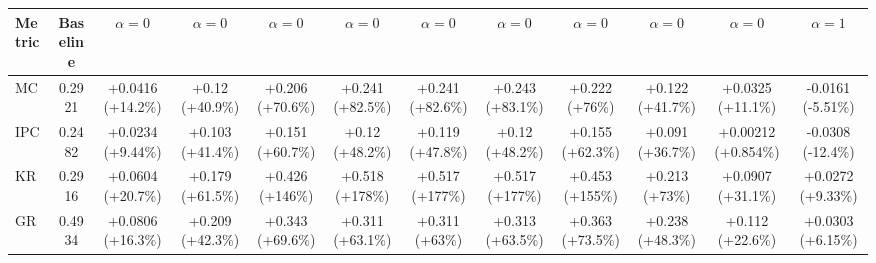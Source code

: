 \begin{tabular}{lccccccccccc}
\toprule
Metric & Baseline & $\alpha=0$ & $\alpha=0$ & $\alpha=0$ & $\alpha=0$ & $\alpha=0$ & $\alpha=0$ & $\alpha=0$ & $\alpha=0$ & $\alpha=0$ & $\alpha=1$ \\
\midrule
MC & 0.2921 & +0.0416 (+14.2\%) & +0.12 (+40.9\%) & +0.206 (+70.6\%) & +0.241 (+82.5\%) & +0.241 (+82.6\%) & +0.243 (+83.1\%) & +0.222 (+76\%) & +0.122 (+41.7\%) & +0.0325 (+11.1\%) & -0.0161 (-5.51\%) \\
IPC & 0.2482 & +0.0234 (+9.44\%) & +0.103 (+41.4\%) & +0.151 (+60.7\%) & +0.12 (+48.2\%) & +0.119 (+47.8\%) & +0.12 (+48.2\%) & +0.155 (+62.3\%) & +0.091 (+36.7\%) & +0.00212 (+0.854\%) & -0.0308 (-12.4\%) \\
KR & 0.2916 & +0.0604 (+20.7\%) & +0.179 (+61.5\%) & +0.426 (+146\%) & +0.518 (+178\%) & +0.517 (+177\%) & +0.517 (+177\%) & +0.453 (+155\%) & +0.213 (+73\%) & +0.0907 (+31.1\%) & +0.0272 (+9.33\%) \\
GR & 0.4934 & +0.0806 (+16.3\%) & +0.209 (+42.3\%) & +0.343 (+69.6\%) & +0.311 (+63.1\%) & +0.311 (+63\%) & +0.313 (+63.5\%) & +0.363 (+73.5\%) & +0.238 (+48.3\%) & +0.112 (+22.6\%) & +0.0303 (+6.15\%) \\
\bottomrule
\end{tabular}
